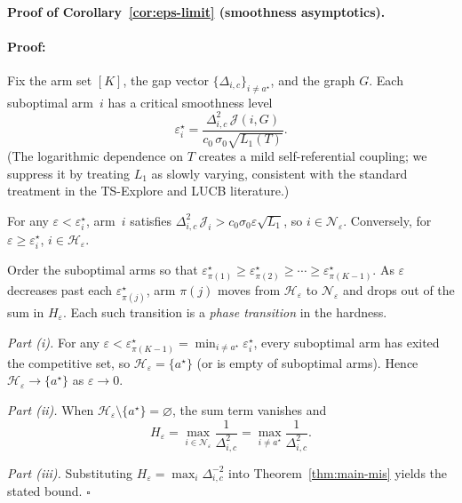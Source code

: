 \documentclass{article}
\newenvironment{proof}{\paragraph{Proof:}}{\hfill$\square$}
\begin{document}
\paragraph{Proof of Corollary~\ref{cor:eps-limit} (smoothness asymptotics).}

\begin{proof}
Fix the arm set $[K]$, the gap vector $\{\Delta_{i,c}\}_{i\neq a^\star}$, and
the graph $G$. Each suboptimal arm~$i$ has a critical smoothness level
\[
\varepsilon_i^\star
=
\frac{\Delta_{i,c}^2\,\mathcal J(i,G)}{c_0\,\sigma_0\sqrt{L_1(T)}}.
\]
(The logarithmic dependence on $T$ creates a mild self-referential coupling; we
suppress it by treating $L_1$ as slowly varying, consistent with the standard
treatment in the TS-Explore and LUCB literature.)

For any $\varepsilon<\varepsilon_i^\star$, arm~$i$ satisfies
$\Delta_{i,c}^2\,\mathcal J_i>c_0\sigma_0\varepsilon\sqrt{L_1}$, so
$i\in\mathcal N_\varepsilon$. Conversely, for
$\varepsilon\ge\varepsilon_i^\star$, $i\in\mathcal H_\varepsilon$.

Order the suboptimal arms so that
$\varepsilon_{\pi(1)}^\star\ge\varepsilon_{\pi(2)}^\star\ge\cdots
\ge\varepsilon_{\pi(K-1)}^\star$. As $\varepsilon$ decreases past each
$\varepsilon_{\pi(j)}^\star$, arm $\pi(j)$ moves from $\mathcal H_\varepsilon$
to $\mathcal N_\varepsilon$ and drops out of the sum in $H_\varepsilon$. Each
such transition is a \emph{phase transition} in the hardness.

\emph{Part (i).}
For any $\varepsilon<\varepsilon_{\pi(K-1)}^\star
=\min_{i\neq a^\star}\varepsilon_i^\star$, every suboptimal arm has exited the
competitive set, so $\mathcal H_\varepsilon=\{a^\star\}$ (or is empty of
suboptimal arms). Hence $\mathcal H_\varepsilon\to\{a^\star\}$ as
$\varepsilon\to 0$.

\emph{Part (ii).}
When $\mathcal H_\varepsilon\setminus\{a^\star\}=\varnothing$, the sum term
vanishes and
\[
H_\varepsilon
=
\max_{i\in\mathcal N_\varepsilon}\frac{1}{\Delta_{i,c}^2}
=
\max_{i\neq a^\star}\frac{1}{\Delta_{i,c}^2}.
\]

\emph{Part (iii).}
Substituting $H_\varepsilon=\max_i\Delta_{i,c}^{-2}$ into
Theorem~\ref{thm:main-mis} yields the stated bound.
\end{proof}
\end{document}
